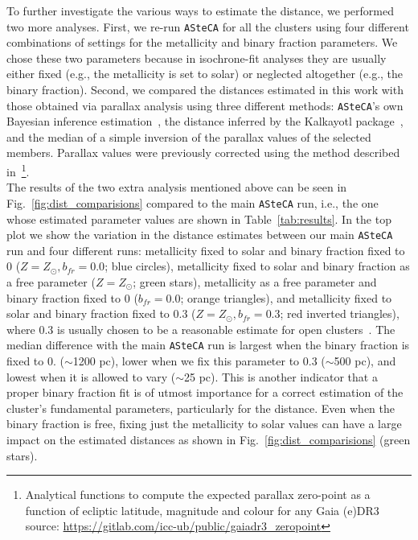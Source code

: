 \documentclass{aa}
\begin{document}
  To further investigate the various ways to estimate the distance, we performed
  two more analyses. First, we re-run \texttt{ASteCA} for all the
  clusters using four different combinations of settings for the metallicity and
  binary fraction parameters. We chose these two parameters because in
  isochrone-fit analyses they are usually either fixed (e.g., the metallicity is
  set to solar) or neglected altogether (e.g., the binary fraction).
  Second, we compared the distances estimated in this work with those obtained
  via parallax analysis using three different methods: \texttt{ASteCA}'s own
  Bayesian inference estimation~\citep[described in][]{Perren_2020}, the
  distance inferred by the Kalkayotl package~\citep{Kalkayotl}, and the median
  of a simple inversion of the parallax values of the selected members.
  Parallax values were previously corrected using the method described
  in~\cite{Lindegren_2021}\footnote{ Analytical functions to compute the
  expected parallax zero-point as a function of ecliptic latitude, magnitude and
  colour for any Gaia (e)DR3
  source: \url{https://gitlab.com/icc-ub/public/gaiadr3_zeropoint}}.\\

  The results of the two extra analysis mentioned above can be seen in
  Fig.~\ref{fig:dist_comparisions} compared to the main \texttt{ASteCA} run,
  i.e., the one whose estimated parameter values are shown in
  Table~\ref{tab:results}.
  In the top plot we show the variation in the distance estimates between our
  main \texttt{ASteCA} run and four different runs: metallicity fixed to solar
  and binary fraction fixed to 0 ($Z=Z_{\odot},b_{fr}=0.0$; blue circles),
  metallicity fixed to solar and binary fraction as a free parameter
  ($Z=Z_{\odot}$; green stars), metallicity as a free parameter and binary
  fraction fixed to 0 ($b_{fr}=0.0$; orange triangles), and metallicity fixed to
  solar and binary fraction fixed to 0.3 ($Z=Z_{\odot},b_{fr}=0.3$; red
  inverted triangles), where 0.3 is usually chosen to be a reasonable estimate
  for open clusters~\citep{Sollima_2010}. The median difference with the main
  \texttt{ASteCA} run is largest when the binary fraction is fixed to 0. 
  ($\sim$1200 pc), lower when we fix this parameter to 0.3 ($\sim$500 pc),
  and lowest when it is allowed to vary ($\sim$25 pc). This is another indicator
  that a proper binary fraction fit is of utmost importance for a correct
  estimation of the cluster's fundamental parameters, particularly for the
  distance. Even when the binary fraction is free, fixing just the metallicity
  to solar values can have a large impact on the estimated distances as shown in
  Fig.~\ref{fig:dist_comparisions} (green stars).
\end{document}
